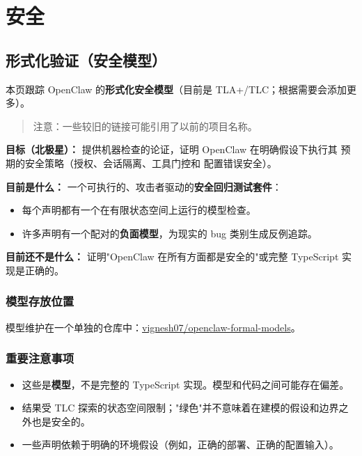 \chapter{安全}

\section{形式化验证（安全模型）}


本页跟踪 OpenClaw 的\textbf{形式化安全模型}（目前是 TLA+/TLC；根据需要会添加更多）。

\begin{quote}
注意：一些较旧的链接可能引用了以前的项目名称。
\end{quote}


\textbf{目标（北极星）：} 提供机器检查的论证，证明 OpenClaw 在明确假设下执行其
预期的安全策略（授权、会话隔离、工具门控和
配置错误安全）。

\textbf{目前是什么：} 一个可执行的、攻击者驱动的\textbf{安全回归测试套件}：

\begin{itemize}
  \item 每个声明都有一个在有限状态空间上运行的模型检查。
  \item 许多声明有一个配对的\textbf{负面模型}，为现实的 bug 类别生成反例追踪。
\end{itemize}


\textbf{目前还不是什么：} 证明"OpenClaw 在所有方面都是安全的"或完整 TypeScript 实现是正确的。

\subsection{模型存放位置}


模型维护在一个单独的仓库中：\href{https://github.com/vignesh07/openclaw-formal-models}{vignesh07/openclaw-formal-models}。

\subsection{重要注意事项}


\begin{itemize}
  \item 这些是\textbf{模型}，不是完整的 TypeScript 实现。模型和代码之间可能存在偏差。
  \item 结果受 TLC 探索的状态空间限制；"绿色"并不意味着在建模的假设和边界之外也是安全的。
  \item 一些声明依赖于明确的环境假设（例如，正确的部署、正确的配置输入）。
\end{itemize}


